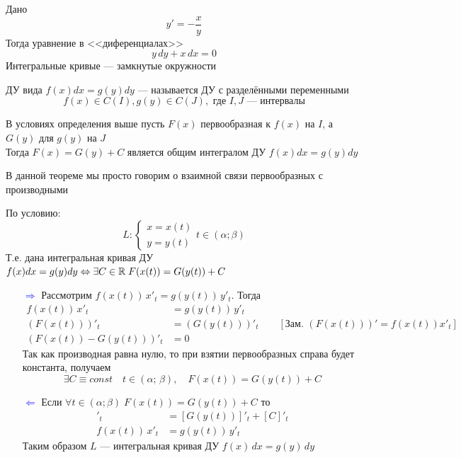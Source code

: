 \begin{Example}
    Дано
    \[
        y' = -\frac{x}{y}
    \]
    Тогда уравнение в <<диференциалах>>
    \[
        y\,dy + x\,dx = 0
    \]
    Интегральные кривые --- замкнутые окружности
\end{Example}

\begin{Def}
    ДУ вида $f(x)dx = g(y)dy$ --- называется ДУ с разделёнными переменными
    \[
        f(x) \in C(I), g(y) \in C(J), \text{ где } I, J \text{ --- интервалы}
    \]
\end{Def}

\begin{Th}
    В условиях определения выше пусть $F(x)$ первообразная к $f(x)$ на $I$, а $G(y)$ для $g(y)$ на $J$\\
    Тогда $F(x) = G(y) + C$ является общим интегралом ДУ $f(x)dx = g(y)dy$
\end{Th}
\begin{Note}
    В данной теореме мы просто говорим о взаимной связи первообразных с производными
\end{Note}
\begin{Proof}
    По условию:
    \[
        L: \begin{cases}
           x = x(t)\\
           y = y(t) 
        \end{cases} t \in (\alpha; \beta)
    \]
    Т.е. дана интегральная кривая ДУ $f(x)dx = g(y)dy \Leftrightarrow \exists C \in \mathbb{R} \; F(x(t)) = G(y(t)) + C$
    
    \begin{enumerate}
        \item [\textcolor{blue}{$\Rightarrow$}] Рассмотрим $f(x(t))\,x'_t = g(y(t))\,y'_t$. Тогда
        \begin{align*}
            f(x(t))\,x'_t &= g(y(t))\,y'_t\\
            (F(x(t)))'_t &= (G(y(t)))'_t \qquad  [\text{Зам. }(F(x(t)))' = f(x(t))x'_t]\\
            (F(x(t)) - G(y(t)))'_t &= 0
        \end{align*}
        Так как производная равна нулю, то при взятии первообразных справа будет константа, получаем
        \[
            \exists C \equiv const \quad t \in (\alpha;\, \beta), \quad F(x(t)) = G(y(t)) + C
        \]
        
        \item[\textcolor{blue}{$\Leftarrow$}] Если $\forall t \in (\alpha; \beta) \; F(x(t)) = G(y(t)) + C$ то
        \begin{align*}
            [F(x(t))]'_t &= [G(y(t))]'_t + [C]'_t\\
            f(x(t))\,x'_t &= g(y(t))\,y'_t
        \end{align*}
        Таким образом $L$ --- интегральная кривая ДУ $f(x)\,dx = g(y)\,dy$
    \end{enumerate}
\end{Proof}


